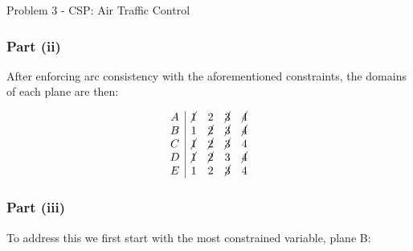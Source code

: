 \begin{problem}{Problem 3 - CSP: Air Traffic Control}
\begin{highlight}
        \subsubsection*{Part (ii)}

        After enforcing arc consistency with the aforementioned constraints, the domains of each plane are then:

        \begin{center}
            \begin{highlightenv}[7.5cm]
                \begin{equation*}
                    \begin{array}{c|cccc}
                        A & \cancel{1} & 2 & \cancel{3} & \cancel{4} \\
                        B & 1 & \cancel{2} & \cancel{3} & \cancel{4} \\
                        C & \cancel{1} & \cancel{2} & \cancel{3} & 4 \\
                        D & \cancel{1} & \cancel{2} & 3 & \cancel{4} \\
                        E & 1 & 2 & \cancel{3} & 4 \\
                    \end{array}
                \end{equation*}
            \end{highlightenv}
        \end{center}

        \subsubsection*{Part (iii)}

        To address this we first start with the most constrained variable, plane B:


\end{highlight}
\end{problem}

